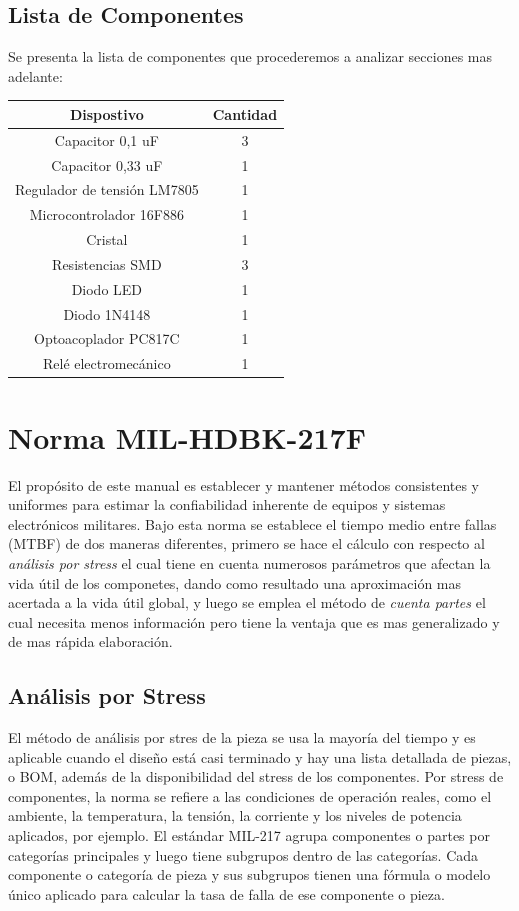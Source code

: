 \documentclass{article}
\begin{document}
\subsection{Lista de Componentes}
Se presenta la lista de componentes que procederemos a analizar secciones mas adelante: \\
\begin{center}
\begin{tabular}{ | c | c | }
  \hline
  Dispostivo & Cantidad \\
  \hline 
    Capacitor 0,1 uF & 3  \\
  \hline 
    Capacitor 0,33 uF & 1  \\
  \hline 
    Regulador de tensión LM7805& 1  \\
  \hline 
    Microcontrolador 16F886 & 1  \\
  \hline
    Cristal  & 1  \\
  \hline
    Resistencias SMD & 3  \\
  \hline
    Diodo LED  & 1  \\
  \hline
    Diodo 1N4148 & 1  \\
  \hline
    Optoacoplador PC817C  & 1  \\
  \hline
    Relé electromecánico  & 1  \\
  \hline
\end{tabular}
\end{center}

\section{Norma MIL-HDBK-217F}
El propósito de este manual es establecer y mantener métodos consistentes y uniformes para estimar la confiabilidad inherente de equipos y sistemas electrónicos militares. Bajo esta norma se establece el tiempo medio entre fallas (MTBF) de dos maneras diferentes, primero se hace el cálculo con respecto al \textit{análisis por stress} el cual tiene en cuenta numerosos parámetros que afectan la vida útil de los componetes, dando como resultado una aproximación mas acertada a la vida útil global, y luego se emplea el método de \textit{cuenta partes} el cual necesita menos información pero tiene la ventaja que es mas generalizado y de mas rápida elaboración.

\subsection{Análisis por Stress}
El método de análisis por stres de la pieza se usa la mayoría del tiempo y es aplicable cuando el diseño está casi terminado y hay una lista detallada de piezas, o BOM, además de la disponibilidad del stress de los componentes. Por stress de componentes, la norma se refiere a las condiciones de operación reales, como el ambiente, la temperatura, la tensión, la corriente y los niveles de potencia aplicados, por ejemplo. El estándar MIL-217 agrupa componentes o partes por categorías principales y luego tiene subgrupos dentro de las categorías. Cada componente o categoría de pieza y sus subgrupos tienen una fórmula o modelo único aplicado para calcular la tasa de falla de ese componente o pieza.
\end{document}
